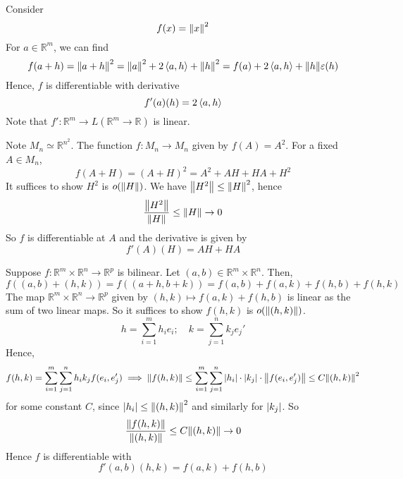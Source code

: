 \begin{example}
	Consider
	\[
		f(x) = \norm{x}^2
	\]
	For \( a \in \mathbb R^m \), we can find
	\[
		f(a+h) = \norm{a+h}^2 = \norm{a}^2 + 2\left\langle{a,h}\right\rangle + \norm{h}^2 = f(a) + 2\left\langle{a,h}\right\rangle + \norm{h} \varepsilon(h)
	\]
	Hence, \( f \) is differentiable with derivative
	\[
		f'(a)(h) = 2\left\langle{a,h}\right\rangle
	\]
	Note that \( f' \colon \mathbb R^m \to L(\mathbb R^m \to \mathbb R) \) is linear.
\end{example}
\begin{example}
	Note \( M_n \simeq \mathbb R^{n^2} \).
	The function \( f \colon M_n \to M_n \) given by \( f(A) = A^2 \).
	For a fixed \( A \in M_n \),
	\[
		f(A+H) = (A+H)^2 = A^2 + AH + HA + H^2
	\]
	It suffices to show \( H^2 \) is \( o(\norm{H}) \).
	We have \( \norm{H^2} \leq \norm{H}^2 \), hence
	\[
		\frac{\norm{H^2}}{\norm{H}} \leq \norm{H} \to 0
	\]
	So \( f \) is differentiable at \( A \) and the derivative is given by
	\[
		f'(A)(H) = AH + HA
	\]
\end{example}
\begin{example}
	Suppose \( f \colon \mathbb R^m \times \mathbb R^n \to \mathbb R^p \) is bilinear.
	Let \( (a, b) \in \mathbb R^m \times \mathbb R^n \).
	Then,
	\[
		f((a,b) + (h,k)) = f((a+h, b+k)) = f(a,b) + f(a,k) + f(h,b) + f(h,k)
	\]
	The map \( \mathbb R^m \times \mathbb R^n \to \mathbb R^p \) given by \( (h,k) \mapsto f(a,k) + f(h,b) \) is linear as the sum of two linear maps.
	So it suffices to show \( f(h,k) \) is \( o(\norm{(h,k)}) \).
	\[
		h = \sum_{i=1}^m h_i e_i;\quad k = \sum_{j=1}^n k_j e_j'
	\]
	Hence,
	\[
		f(h,k) = \sum_{i=1}^m \sum_{j=1}^n h_i k_j f(e_i, e_j') \implies \norm{f(h,k)} \leq \sum_{i=1}^m \sum_{j=1}^n \abs{h_i} \cdot \abs{k_j} \cdot \norm{f(e_i, e_j')} \leq C \norm{(h,k)}^2
	\]
	for some constant \( C \), since \( \abs{h_i} \leq \norm{(h,k)}^2 \) and similarly for \( \abs{k_j} \).
	So
	\[
		\frac{\norm{f(h,k)}}{\norm{(h,k)}} \leq C \norm{(h,k)} \to 0
	\]
	Hence \( f \) is differentiable with
	\[
		f'(a,b)(h,k) = f(a,k) + f(h,b)
	\]
\end{example}

